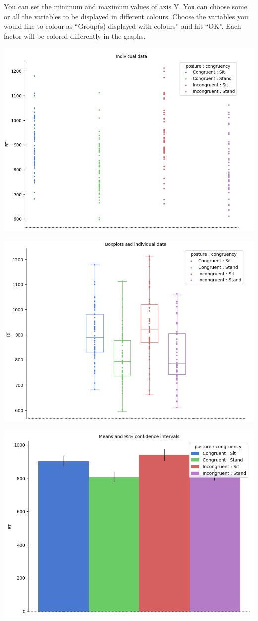 \documentclass[
]{book}
\begin{document}
You can set the minimum and maximum values of axis Y. You can choose some or all the variables to be displayed in different colours. Choose the variables you would like to colour as ``Group(s) displayed with colours'' and hit ``OK''. Each factor will be colored differently in the graphs.

\includegraphics{img/ch10/10.4display_plot.png}

\includegraphics{img/ch10/10.4display_boxplot.png}

\includegraphics{img/ch10/10.4display_CIplot.png}
\end{document}
